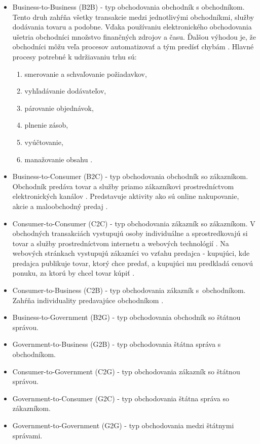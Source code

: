 \documentclass[
  printed, %
  table,   %
  lof,     %
  nolot,     %
  twoside,  
]{fithesis3}
\begin{document}
\begin{itemize}
	\item Business-to-Business (B2B) - typ obchodovania obchodník s obchodníkom. Tento druh zahŕňa všetky transakcie medzi jednotlivými obchodníkmi, služby dodávania tovaru a podobne. Vďaka používaniu elektronického obchodovania ušetria obchodníci množstvo finančných zdrojov a času. Ďalšou výhodou je, že obchodníci môžu veľa procesov automatizovať a tým predísť chybám \cite{ec1}. Hlavné procesy potrebné k  udržiavaniu trhu sú:
	\begin{enumerate}
	 \item smerovanie a schvaľovanie požiadavkov,
	 \item vyhľadávanie dodávateľov,
	 \item párovanie objednávok,
	 \item plnenie zásob,
	 \item vyúčtovanie,
	 \item manažovanie obsahu \cite{ec2}.
	\end{enumerate}
	
	\item Business-to-Consumer (B2C) - typ obchodovania obchodník so zákazníkom. Obchodník predáva tovar a služby priamo zákazníkovi prostredníctvom elektronických kanálov \cite{ec1}. Predstavuje aktivity ako sú online nakupovanie, akcie a maloobchodný predaj \cite{ec2}.
	\item Consumer-to-Consumer (C2C) - typ obchodovania zákazník so zákazníkom.  V obchodných transakciách vystupujú osoby individuálne a sprostredkovajú si tovar a služby prostredníctvom internetu a webových technológií \cite{ec1}. Na webových stránkach vystupujú zákazníci vo vzťahu predajca - kupujúci, kde predajca publikuje tovar, ktorý chce predať, a kupujúci mu predkladá cenovú ponuku, za ktorú by chcel tovar kúpiť \cite{ec2}.
	\item Consumer-to-Business (C2B) - typ obchodovania zákazník s~obchodníkom. Zahŕňa individuality predavajúce obchodníkom \cite{ec1}.
	\item Business-to-Government (B2G) - typ obchodovania obchodník so štátnou správou.
	\item Government-to-Business (G2B) - typ obchodovania štátna správa s obchodníkom.
	\item Consumer-to-Government (C2G) - typ obchodovania zákazník so štátnou správou.
	\item Government-to-Consumer (G2C) - typ obchodovania štátna správa so zákazníkom.
	\item Government-to-Government (G2G) - typ obchodovania medzi štátnymi správami.
\end{itemize}
\end{document}
